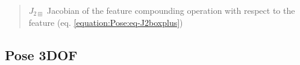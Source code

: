 \documentclass[letterpaper,10pt,english]{sphinxmanual}
\begin{document}
\begin{fulllineitems}
\begin{fulllineitems}
\begin{quote}
\begin{description}
\sphinxAtStartPar
\(J_{2\boxplus}\) Jacobian of the feature compounding operation with respect to the feature (eq. \eqref{equation:Pose:eq-J2boxplus})

\end{description}\end{quote}

\end{fulllineitems}


\end{fulllineitems}



\subsection{Pose 3DOF}
\label{\detokenize{Pose:pose-3dof}}
\begin{figure}[htbp]
\centering

\noindent{}
\end{figure}
\end{document}
